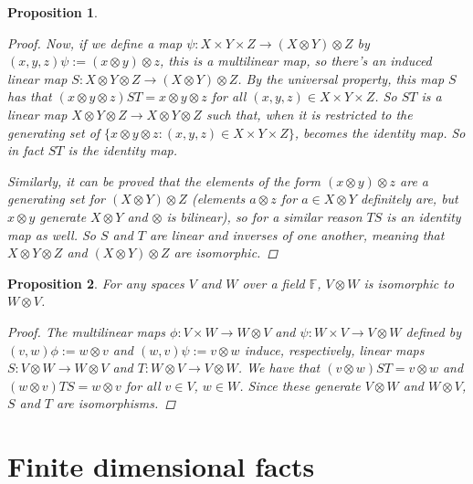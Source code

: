 \documentclass[a4paper,14pt]{article}
\newtheorem*{prop}{Proposition}
\begin{document}
\begin{prop}
\begin{proof}
Now, if we define a map $\psi: X \times Y \times Z \to (X \otimes Y) \otimes Z$ by $(x, y, z) \psi := (x \otimes y) \otimes z$, this is a multilinear map, so there's an induced linear map $S: X \otimes Y \otimes Z \to (X \otimes Y) \otimes Z$. By the universal property, this map $S$ has that $(x \otimes y \otimes z) ST = x \otimes y \otimes z$ for all $(x, y, z) \in X \times Y \times Z$. So $ST$ is a linear map $X \otimes Y \otimes Z \to X \otimes Y \otimes Z$ such that, when it is restricted to the generating set of $\{x \otimes y \otimes z : (x, y, z) \in X \times Y \times Z\}$, becomes the identity map. So in fact $ST$ is the identity map.

Similarly, it can be proved that the elements of the form $(x \otimes y) \otimes z$ are a generating set for $(X \otimes Y) \otimes Z$ (elements $a \otimes z$ for $a \in X \otimes Y$ definitely are, but $x \otimes y$ generate $X \otimes Y$ and $\otimes$ is bilinear), so for a similar reason $TS$ is an identity map as well. So $S$ and $T$ are linear and inverses of one another, meaning that $X \otimes Y \otimes Z$ and $(X \otimes Y) \otimes Z$ are isomorphic.
\end{proof}
\end{prop}

\begin{prop}
For any spaces $V$ and $W$ over a field $\mathbb{F}$, $V \otimes W$ is isomorphic to $W \otimes V$.
\begin{proof}
    The multilinear maps $\phi: V \times W \to W \otimes V$ and $\psi: W \times V \to V \otimes W$ defined by $(v, w) \phi := w \otimes v$ and $(w, v) \psi := v \otimes w$ induce, respectively, linear maps $S: V \otimes W \to W \otimes V$ and $T: W \otimes V \to V \otimes W$. We have that $(v \otimes w) ST = v \otimes w$ and $(w \otimes v) TS = w \otimes v$ for all $v \in V$, $w \in W$. Since these generate $V \otimes W$ and $W \otimes V$, $S$ and $T$ are isomorphisms.
\end{proof}
\end{prop}

\section{Finite dimensional facts}
\end{document}
